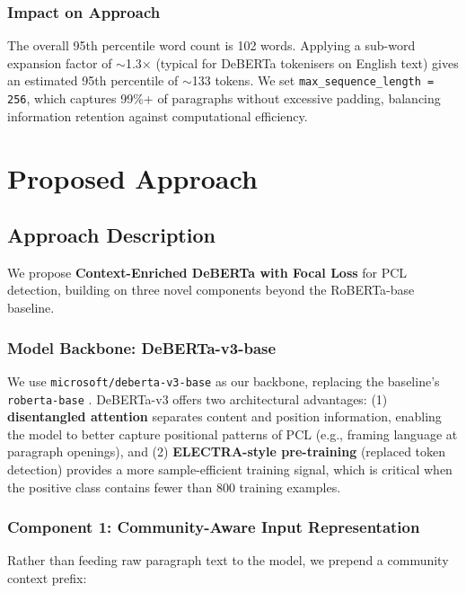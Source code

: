 \documentclass[12pt,twoside]{report}
\begin{document}
\subsection{Impact on Approach}

The overall 95th percentile word count is 102 words. Applying a sub-word expansion factor of $\sim$1.3$\times$ (typical for DeBERTa tokenisers on English text) gives an estimated 95th percentile of $\sim$133 tokens. We set \texttt{max\_sequence\_length\,=\,256}, which captures 99\%+ of paragraphs without excessive padding, balancing information retention against computational efficiency.


\chapter{Proposed Approach}

\section{Approach Description}

We propose \textbf{Context-Enriched DeBERTa with Focal Loss} for PCL detection, building on three novel components beyond the RoBERTa-base baseline.

\subsection{Model Backbone: DeBERTa-v3-base}

We use \texttt{microsoft/deberta-v3-base} \cite{he2021debertav3} as our backbone, replacing the baseline's \texttt{roberta-base} \cite{liu2019roberta}. DeBERTa-v3 offers two architectural advantages: (1) \textbf{disentangled attention} separates content and position information, enabling the model to better capture positional patterns of PCL (e.g., framing language at paragraph openings), and (2) \textbf{ELECTRA-style pre-training} (replaced token detection) provides a more sample-efficient training signal, which is critical when the positive class contains fewer than 800 training examples.

\subsection{Component 1: Community-Aware Input Representation}

Rather than feeding raw paragraph text to the model, we prepend a community context prefix:
\end{document}
